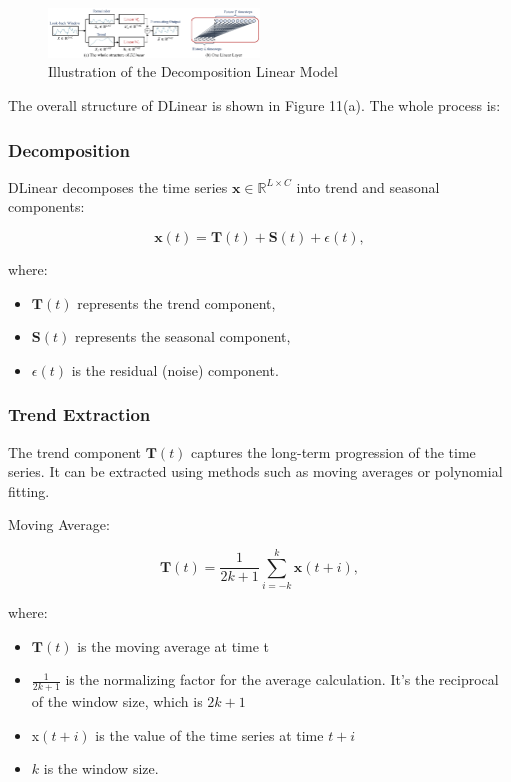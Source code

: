 \documentclass{ieeeojies}
\begin{document}
\begin{figure} [H]
    \centering
    \includegraphics[width=0.5\textwidth]{bibliography/Figure/Illu_DLinear.png}
    \caption{Illustration of the Decomposition Linear Model}
    \label{fig:DLinear Illustration}
\end{figure}

The overall structure of DLinear is shown in Figure 11(a). The whole process is:

\subsubsection{Decomposition}
DLinear decomposes the time series $\mathbf{x} \in \mathbb{R}^{L \times C}$ into trend and seasonal components:

\begin{equation}
    \mathbf{x}(t) = \mathbf{T}(t) + \mathbf{S}(t) + \epsilon(t),
\end{equation}

where:
\begin{itemize}
    \item $\mathbf{T}(t)$ represents the trend component,
    \item $\mathbf{S}(t)$ represents the seasonal component,
    \item $\epsilon(t)$ is the residual (noise) component.
\end{itemize}

\subsubsection{Trend Extraction}
The trend component $\mathbf{T}(t)$ captures the long-term progression of the time series. It can be extracted using methods such as moving averages or polynomial fitting.

Moving Average:

\begin{equation}
    \mathbf{T}(t) = \frac{1}{2k+1} \sum_{i=-k}^{k} \mathbf{x}(t+i),
\end{equation}

where:
\begin{itemize}
    \item $\mathbf{T}(t)$ is the moving average at time t
    \item $\frac{1}{2k+1}$ is the normalizing factor for the average calculation. It's the reciprocal of the window size, which is $2k+1$
    \item x$(t+i)$ is the value of the time series at time $t+i$
    \item $k$ is the window size.
\end{itemize}
\end{document}
